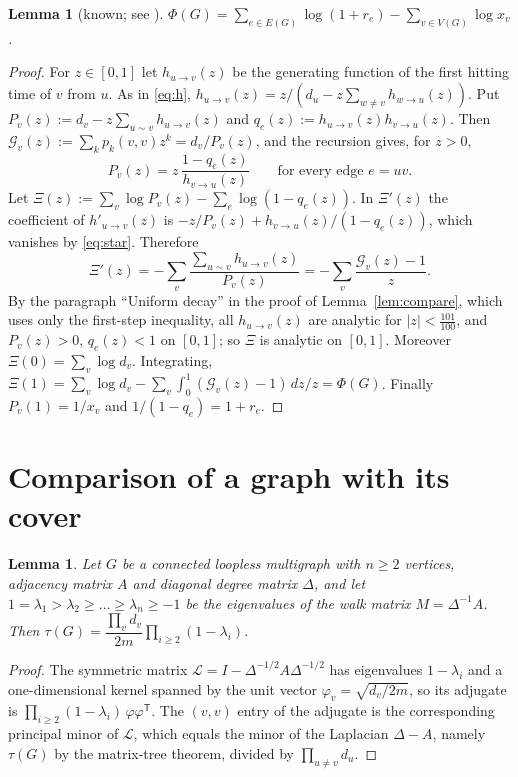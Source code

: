 \documentclass[11pt]{amsart}
\theoremstyle{plain}
\newtheorem{lemma}[theorem]{Lemma}
\theoremstyle{remark}
\newcommand{\cG}{\mathcal{G}}
\begin{document}
\begin{lemma}[known; see \cite{BBGSS,Watanabe}]\label{lem:formula}
$\displaystyle\Phi(G)=\sum_{e\in E(G)}\log(1+r_e)-\sum_{v\in V(G)}\log x_v$.
\end{lemma}
\begin{proof}
For $z\in[0,1]$ let $h_{u\to v}(z)$ be the generating function of the first hitting time of $v$ from $u$. As in
\eqref{eq:h}, $h_{u\to v}(z)=z/(d_u-z\sum_{w\ne v}h_{w\to u}(z))$. Put $P_v(z):=d_v-z\sum_{u\sim v}h_{u\to v}(z)$ and
$q_e(z):=h_{u\to v}(z)h_{v\to u}(z)$. Then $\cG_v(z):=\sum_kp_k(v,v)z^k=d_v/P_v(z)$, and the recursion gives, for
$z>0$,
\begin{equation}\label{eq:star}
 P_v(z)=z\,\frac{1-q_e(z)}{h_{v\to u}(z)}\qquad\text{for every edge }e=uv .
\end{equation}
Let $\Xi(z):=\sum_v\log P_v(z)-\sum_e\log(1-q_e(z))$. In $\Xi'(z)$ the coefficient of $h'_{u\to v}(z)$ is
$-z/P_v(z)+h_{v\to u}(z)/(1-q_e(z))$, which vanishes by \eqref{eq:star}. Therefore
\[
 \Xi'(z)=-\sum_v\frac{\sum_{u\sim v}h_{u\to v}(z)}{P_v(z)}=-\sum_v\frac{\cG_v(z)-1}{z}.
\]
By the paragraph ``Uniform decay'' in the proof of Lemma~\ref{lem:compare}, which uses only the first-step
inequality, all $h_{u\to v}(z)$ are analytic for $|z|<\frac{101}{100}$, and $P_v(z)>0$, $q_e(z)<1$ on $[0,1]$; so
$\Xi$ is analytic on $[0,1]$. Moreover $\Xi(0)=\sum_v\log d_v$. Integrating, $\Xi(1)=\sum_v\log d_v-\sum_v\int_0^1(\cG_v(z)-1)\,dz/z=\Phi(G)$. Finally
$P_v(1)=1/x_v$ and $1/(1-q_e)=1+r_e$.
\end{proof}

\section{Comparison of a graph with its cover}\label{sec:compare}

\begin{lemma}\label{lem:mtt}
Let $G$ be a connected loopless multigraph with $n\ge2$ vertices, adjacency matrix $A$ and diagonal degree
matrix $\Delta$, and let $1=\lambda_1>\lambda_2\ge\dots\ge\lambda_n\ge-1$ be the eigenvalues of the walk matrix
$M=\Delta^{-1}A$. Then
$\tau(G)=\dfrac{\prod_vd_v}{2m}\prod_{i\ge2}(1-\lambda_i)$.
\end{lemma}
\begin{proof}
The symmetric matrix $\mathcal L=I-\Delta^{-1/2}A\Delta^{-1/2}$ has eigenvalues $1-\lambda_i$ and a one-dimensional kernel
spanned by the unit vector $\varphi_v=\sqrt{d_v/2m}$, so its adjugate is $\prod_{i\ge2}(1-\lambda_i)\,\varphi\varphi^{\mathsf T}$.
The $(v,v)$ entry of the adjugate is the corresponding principal minor of $\mathcal L$, which equals the minor of
the Laplacian $\Delta-A$, namely $\tau(G)$ by the matrix-tree theorem, divided by $\prod_{u\ne v}d_u$.
\end{proof}
\end{document}
